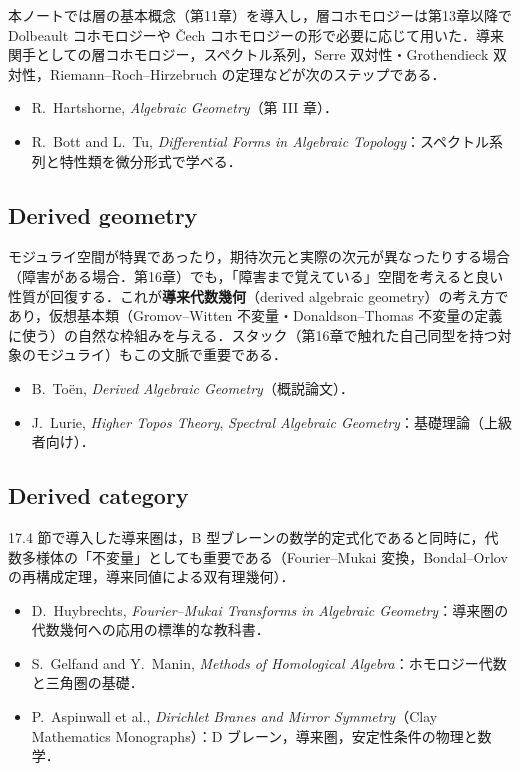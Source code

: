 本ノートでは層の基本概念（第11章）を導入し，層コホモロジーは第13章以降で Dolbeault コホモロジーや \v{C}ech コホモロジーの形で必要に応じて用いた．導来関手としての層コホモロジー，スペクトル系列，Serre 双対性・Grothendieck 双対性，Riemann--Roch--Hirzebruch の定理などが次のステップである．
\begin{itemize}
\item R.~Hartshorne, \textit{Algebraic Geometry}（第 III 章）．
\item R.~Bott and L.~Tu, \textit{Differential Forms in Algebraic Topology}：スペクトル系列と特性類を微分形式で学べる．
\end{itemize}

\subsection{Derived geometry}

モジュライ空間が特異であったり，期待次元と実際の次元が異なったりする場合（障害がある場合．第16章）でも，「障害まで覚えている」空間を考えると良い性質が回復する．これが\textbf{導来代数幾何}（derived algebraic geometry）の考え方であり，仮想基本類（Gromov--Witten 不変量・Donaldson--Thomas 不変量の定義に使う）の自然な枠組みを与える．スタック（第16章で触れた自己同型を持つ対象のモジュライ）もこの文脈で重要である．
\begin{itemize}
\item B.~To\"en, \textit{Derived Algebraic Geometry}（概説論文）．
\item J.~Lurie, \textit{Higher Topos Theory}, \textit{Spectral Algebraic Geometry}：基礎理論（上級者向け）．
\end{itemize}

\subsection{Derived category}

17.4 節で導入した導来圏は，B 型ブレーンの数学的定式化であると同時に，代数多様体の「不変量」としても重要である（Fourier--Mukai 変換，Bondal--Orlov の再構成定理，導来同値による双有理幾何）．
\begin{itemize}
\item D.~Huybrechts, \textit{Fourier--Mukai Transforms in Algebraic Geometry}：導来圏の代数幾何への応用の標準的な教科書．
\item S.~Gelfand and Y.~Manin, \textit{Methods of Homological Algebra}：ホモロジー代数と三角圏の基礎．
\item P.~Aspinwall et al., \textit{Dirichlet Branes and Mirror Symmetry}（Clay Mathematics Monographs）：D ブレーン，導来圏，安定性条件の物理と数学．
\end{itemize}

